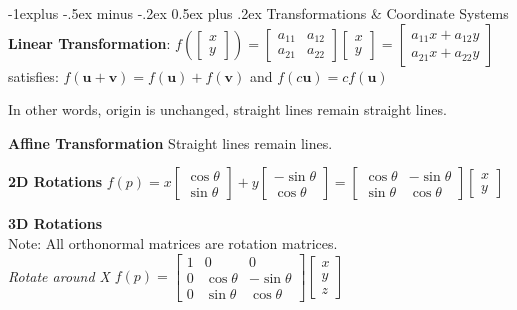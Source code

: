 \documentclass[letterpaper, 8pt]{extarticle}
\makeatletter
\renewcommand{\section}{\@startsection{section}{1}{0mm}%
                                {-1explus -.5ex minus -.2ex}%
                                {0.5ex plus .2ex}%
                                {\normalfont\small\bfseries}}
\makeatother
\begin{document}
\begin{multicols*}{4}
\section{Transformations \& Coordinate Systems}
\textbf{Linear Transformation}:
\(
f(\begin{bmatrix}
    x \\ y
\end{bmatrix})
= \begin{bmatrix}
    a_{11} & a_{12} \\
    a_{21} & a_{22}
\end{bmatrix}
\begin{bmatrix}
    x \\ y
\end{bmatrix}
=
\begin{bmatrix}
    a_{11} x + a_{12} y \\
    a_{21} x + a_{22} y
\end{bmatrix}
\)
satisfies: \(
f(\mathbf{u} + \mathbf{v})
= f(\mathbf{u}) + f(\mathbf{v})
\)
and
\(
f(c\mathbf{u}) = cf(\mathbf{u})
\)

In other words, origin is unchanged, straight lines remain straight lines.

\textbf{Affine Transformation}
Straight lines remain lines.

\textbf{2D Rotations}
\(
f(p)
= x \begin{bmatrix}
    \cos \theta \\ \sin \theta
\end{bmatrix}
+ y \begin{bmatrix}
    -\sin \theta \\ \cos \theta
\end{bmatrix}
= \begin{bmatrix}
    \cos \theta & - \sin \theta \\
    \sin \theta & \cos \theta
\end{bmatrix}
\begin{bmatrix}
    x \\ y
\end{bmatrix}
\)

\textbf{3D Rotations} \\
Note: All orthonormal matrices are rotation matrices. \\
\textit{Rotate around X}
\(
f(p) = \begin{bmatrix}
    1 & 0           & 0            \\
    0 & \cos \theta & -\sin \theta \\
    0 & \sin \theta & \cos \theta
\end{bmatrix}
\begin{bmatrix}
    x \\ y \\ z
\end{bmatrix}
\)


\end{multicols*}
\end{document}
